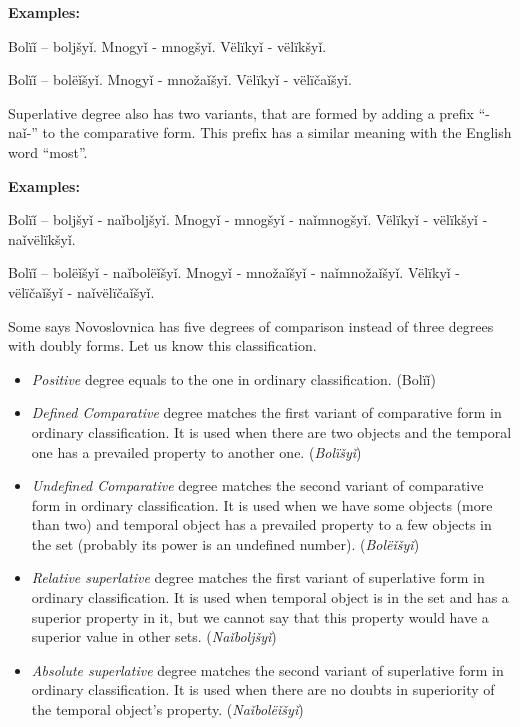 \textbf{Examples:}

Bolïǐ – boljšyǐ. Mnogyǐ - mnogšyǐ. Vëlïkyǐ - vëlïkšyǐ.

Bolïǐ – bolëǐšyǐ. Mnogyǐ - množaǐšyǐ. Vëlïkyǐ - vëlïčaǐšyǐ.

Superlative degree also has two variants, that are formed by adding a prefix “-naǐ-” to the comparative form. This prefix has a similar meaning with the English word “most”.

\textbf{Examples:}

Bolïǐ – boljšyǐ - naǐboljšyǐ. Mnogyǐ - mnogšyǐ - naǐmnogšyǐ. Vëlïkyǐ - vëlïkšyǐ - naǐvëlïkšyǐ.

Bolïǐ – bolëǐšyǐ - naǐbolëǐšyǐ. Mnogyǐ - množaǐšyǐ - naǐmnožaǐšyǐ. Vëlïkyǐ - vëlïčaǐšyǐ - naǐvëlïčaǐšyǐ.

Some says Novoslovnica has five degrees of comparison instead of three degrees with doubly forms. Let us know this classification.

\begin{itemize}
	\item \textit{Positive} degree equals to the one in ordinary classification. (Bolïǐ)

	\item \textit{Defined Comparative} degree matches the first variant of comparative form in ordinary classification. It is used when there are two objects and the temporal one has a prevailed property to another one. (\textit{Bolïšyǐ})

	\item \textit{Undefined Comparative} degree matches the second variant of comparative form in ordinary classification. It is used when we have some objects (more than two) and temporal object has a prevailed property to a few objects in the set (probably its power is an undefined number). (\textit{Bolëǐšyǐ})

	\item \textit{Relative superlative} degree matches the first variant of superlative form in ordinary classification. It is used when temporal object is in the set and has a superior property in it, but we cannot say that this property would have a superior value in other sets. (\textit{Naǐboljšyǐ})

	\item \textit{Absolute superlative} degree matches the second variant of superlative form in ordinary classification. It is used when there are no doubts in superiority of the temporal object’s property. (\textit{Naǐbolëǐšyǐ})
\end{itemize}


